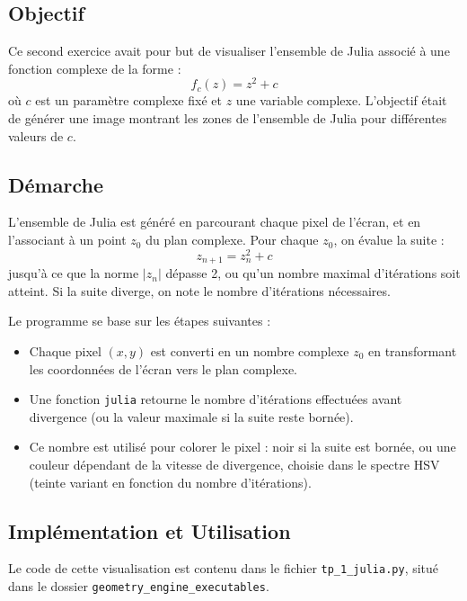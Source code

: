 \documentclass[a4paper,12pt]{article}
\begin{document}
\newpage


\subsection*{Objectif}

Ce second exercice avait pour but de visualiser l'ensemble de Julia associé à une fonction complexe de la forme :
\[
f_c(z) = z^2 + c
\]
où \(c\) est un paramètre complexe fixé et \(z\) une variable complexe. L'objectif était de générer une image montrant les zones de l'ensemble de Julia pour différentes valeurs de \(c\).

\subsection*{Démarche}

L'ensemble de Julia est généré en parcourant chaque pixel de l'écran, et en l'associant à un point \(z_0\) du plan complexe. Pour chaque \(z_0\), on évalue la suite :
\[
z_{n+1} = z_n^2 + c
\]
jusqu'à ce que la norme \(|z_n|\) dépasse 2, ou qu’un nombre maximal d’itérations soit atteint. Si la suite diverge, on note le nombre d’itérations nécessaires.

Le programme se base sur les étapes suivantes :

\begin{itemize}
    \item Chaque pixel \((x, y)\) est converti en un nombre complexe \(z_0\) en transformant les coordonnées de l'écran vers le plan complexe.
    \item Une fonction \texttt{julia} retourne le nombre d’itérations effectuées avant divergence (ou la valeur maximale si la suite reste bornée).
    \item Ce nombre est utilisé pour colorer le pixel : noir si la suite est bornée, ou une couleur dépendant de la vitesse de divergence, choisie dans le spectre HSV (teinte variant en fonction du nombre d’itérations).
\end{itemize}

\subsection*{Implémentation et Utilisation}

Le code de cette visualisation est contenu dans le fichier \texttt{tp\_1\_julia.py}, situé dans le dossier \texttt{geometry\_engine\_executables}.
\end{document}
